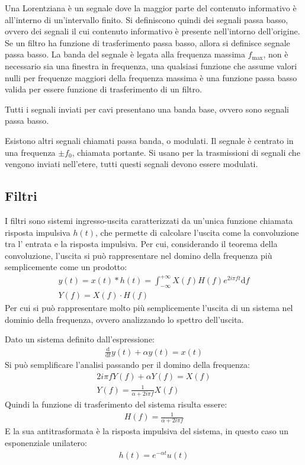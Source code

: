 \documentclass{article}
\newcommand{\df}{\mathrm{d}}
\numberwithin{equation}{subsection}
\begin{document}
Una Lorentziana è un segnale dove la maggior parte del contenuto informativo è all'interno di un'intervallo finito. Si definiscono quindi dei segnali passa basso, 
ovvero dei segnali il cui contenuto informativo è presente nell'intorno dell'origine. Se un filtro ha funzione di trasferimento passa basso, allora si definisce segnale 
passa basso. La banda del segnale è legata alla frequenza massima $f_{\max}$, non è necessario sia una finestra in frequenza, una qualsiasi funzione che assume valori nulli 
per frequenze maggiori della frequenza massima è una funzione passa basso valida per essere funzione di trasferimento di un filtro. 

Tutti i segnali inviati per cavi presentano una banda base, ovvero sono segnali passa basso. 


Esistono altri segnali chiamati passa banda, o modulati. Il segnale è centrato in una frequenza $\pm f_0$, chiamata portante. Si usano per la trasmissioni di segnali 
che vengono inviati nell'etere, tutti questi segnali devono essere modulati. 

\subsection{Filtri}

I filtri sono sistemi ingresso-uscita caratterizzati da un'unica funzione chiamata risposta impulsiva $h(t)$, che permette di calcolare l'uscita come la convoluzione tra l'
entrata e la risposta impulsiva. Per cui, considerando il teorema della convoluzione, l'uscita si può rappresentare nel domino della frequenza più semplicemente come un prodotto:
\begin{gather*}
    y(t)=x(t)*h(t)=\displaystyle\int_{-\infty}^{+\infty}X(f)H(f)e^{2i\pi ft}\df f\\
    Y(f)=X(f)\cdot H(f)
\end{gather*}
Per cui si può rappresentare molto più semplicemente l'uscita di un sistema nel dominio della frequenza, ovvero analizzando lo spettro dell'uscita. 


Dato un sistema definito dall'espressione:
\begin{gather*}
    \displaystyle\frac{\df}{\df t}y(t)+\alpha y(t)=x(t)
\end{gather*}
Si può semplificare l'analisi passando per il domino della frequenza: 
\begin{gather*}
    2i\pi fY(f)+\alpha Y(f)=X(f)\\
    Y(f)=\displaystyle\frac{1}{\alpha+2i\pi f}X(f)
\end{gather*}
Quindi la funzione di trasferimento del sistema risulta essere:
\begin{gather*}
    H(f)=\displaystyle\frac{1}{\alpha+2i\pi f}
\end{gather*}
E la sua antitrasformata è la risposta impulsiva del sistema, in questo caso un esponenziale unilatero: 
\begin{gather*}
    h(t)=e^{-\alpha t}u(t)
\end{gather*}
\end{document}
